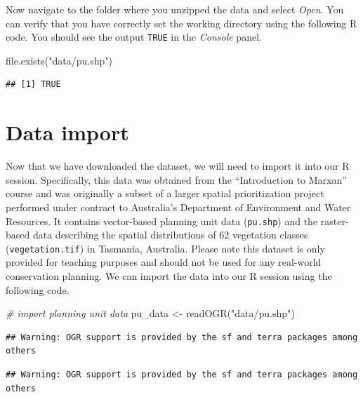 \documentclass[
  12pt,
]{book}
\newenvironment{Shaded}{\begin{snugshade}}{\end{snugshade}}
\newcommand{\CommentTok}[1]{\textcolor[rgb]{0.56,0.35,0.01}{\textit{#1}}}
\newcommand{\FunctionTok}[1]{\textcolor[rgb]{0.00,0.00,0.00}{#1}}
\newcommand{\NormalTok}[1]{#1}
\newcommand{\OtherTok}[1]{\textcolor[rgb]{0.56,0.35,0.01}{#1}}
\newcommand{\StringTok}[1]{\textcolor[rgb]{0.31,0.60,0.02}{#1}}
\begin{document}
\clearpage

Now navigate to the folder where you unzipped the data and select \emph{Open}. You can verify that you have correctly set the working directory using the following R code. You should see the output \texttt{TRUE} in the \emph{Console} panel.

\begin{Shaded}
\begin{Highlighting}[]
\FunctionTok{file.exists}\NormalTok{(}\StringTok{"data/pu.shp"}\NormalTok{)}
\end{Highlighting}
\end{Shaded}

\begin{verbatim}
## [1] TRUE
\end{verbatim}

\hypertarget{data-import}{%
\section{Data import}\label{data-import}}

Now that we have downloaded the dataset, we will need to import it into our R session. Specifically, this data was obtained from the ``Introduction to Marxan'' course and was originally a subset of a larger spatial prioritization project performed under contract to Australia's Department of Environment and Water Resources. It contains vector-based planning unit data (\texttt{pu.shp}) and the raster-based data describing the spatial distributions of 62 vegetation classes (\texttt{vegetation.tif}) in Tasmania, Australia. Please note this dataset is only provided for teaching purposes and should not be used for any real-world conservation planning. We can import the data into our R session using the following code.

\begin{Shaded}
\begin{Highlighting}[]
\CommentTok{\# import planning unit data}
\NormalTok{pu\_data }\OtherTok{\textless{}{-}} \FunctionTok{readOGR}\NormalTok{(}\StringTok{"data/pu.shp"}\NormalTok{)}
\end{Highlighting}
\end{Shaded}

\begin{verbatim}
## Warning: OGR support is provided by the sf and terra packages among others
\end{verbatim}

\begin{verbatim}
## Warning: OGR support is provided by the sf and terra packages among others
\end{verbatim}
\end{document}
